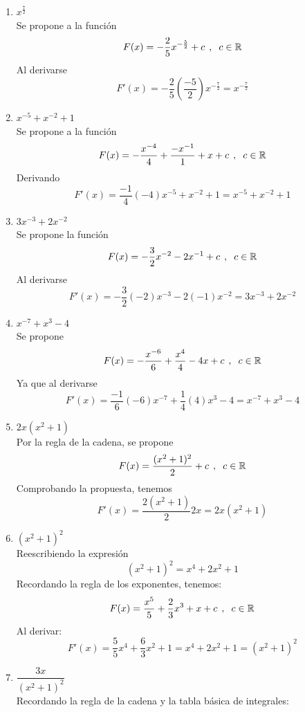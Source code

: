 \documentclass[12pt]{article}
\newcommand{\R}{\ensuremath{\mathbb{R}}}
\begin{document}
\begin{enumerate}
\begin{enumerate}
			Al derivar
			\[F'(x)=-(-3)\dfrac{x^{-4}}{3}=x^{-4} \]
			\item$x^{\frac{7}{2}}$\\
			Se propone a la función
			\[F(x)=-\frac{2}{5}x^{-\frac{5}{2}}+c \hspace{0.15cm},\hspace{0.20cm} c\in\R\]
			Al derivarse
			\[F'(x)=-\frac{2}{5}(\frac{-5}{2})x^{-\frac{7}{2}}=x^{-\frac{7}{2}}\]
			\item$x^{-5}+x^{-2}+1$\\
			Se propone a la función
			\[F(x)=-\dfrac{x^{-4}}{4}+\dfrac{-x^{-1}}{1}+x+c \hspace{0.15cm},\hspace{0.20cm} c\in\R\]
			Derivando
			\[F'(x)=\frac{-1}{4}(-4)x^{-5}+x^{-2}+1=x^{-5}+x^{-2}+1\]
			\item$3x^{-3}+2x^{-2}$\\
			Se propone la función 
			\[F(x)=-\frac{3}{2}x^{-2}-2x^{-1}+c \hspace{0.15cm},\hspace{0.20cm} c\in\R\]
			Al derivarse
			\[F'(x)=-\frac{3}{2}(-2)x^{-3}-2(-1)x^{-2}=3x^{-3}+2x^{-2}\]
			\item$x^{-7}+x^3-4$\\
			Se propone 
			\[F(x)=-\dfrac{x^{-6}}{6}+\dfrac{x^{4}}{4}-4x+c \hspace{0.15cm},\hspace{0.20cm} c\in\R\]
			Ya que al derivarse
			\[F'(x)=\frac{-1}{6}(-6)x^{-7}+\frac{1}{4}(4)x^3-4=x^{-7}+x^3-4\]			
			\item$2x(x^2+1)$\\
			Por la regla de la cadena, se propone
			\[F(x)=\dfrac{(x^2+1)^2}{2}+c \hspace{0.15cm},\hspace{0.20cm} c\in\R\]
			Comprobando la propuesta, tenemos
			\[F'(x)=\dfrac{2(x^2+1)}{2}2x=2x(x^2+1)\]
			\item$(x^2+1)^2$\\
			Reescribiendo la expresión
			\[(x^2+1)^2=x^4+2x^2+1\]
			Recordando la regla de los exponentes, tenemos:
			\[F(x)=\dfrac{x^5}{5}+\frac{2}{3}x^3+x+c \hspace{0.15cm},\hspace{0.20cm} c\in\R\]
			Al derivar:
			\[F'(x)=\frac{5}{5}x^4+\frac{6}{3}x^2+1=x^4+2x^2+1=(x^2+1)^2\]
			\item$\dfrac{3x}{(x^2+1)^2}$\\
			Recordando la regla de la cadena y la tabla básica de integrales:

\end{enumerate}
\end{enumerate}
\end{document}
